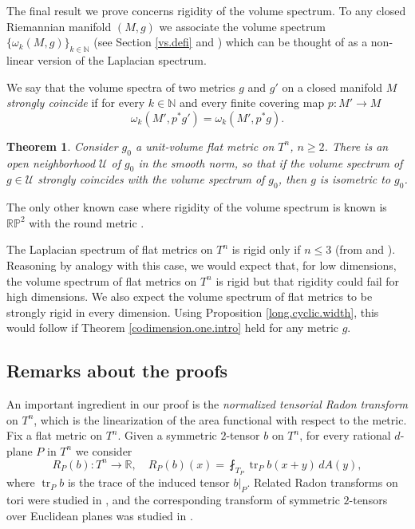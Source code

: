 \documentclass[11pt]{amsart}
\def\R{\mathbb R}
\def\RP{\mathbb {RP}}
\def\N{\mathbb N}
\def\tr{\operatorname{tr}}
\newtheorem{thm}{Theorem}[section]
\theoremstyle{remark}
\theoremstyle{definition}
\begin{document}
	The final result we prove concerns rigidity of the volume spectrum. To any closed Riemannian manifold $(M,g)$ we associate the volume spectrum $\{\omega_k(M,g)\}_{k\in\N}$ (see Section \ref{vs.defi} and \cite{lmn}) which can be thought of as a non-linear version of the Laplacian spectrum.
	
	We say that the volume spectra of two metrics $g$ and $g'$ on a closed manifold $M$ \emph{strongly coincide} if for every $k\in\mathbb N$ and every finite covering map $p:M'\to M$
	$$
	\omega_k(M',p^*g')=\omega_k(M',p^*g).
	$$
	\begin{thm}\label{spectrum.rigidity.intro} Consider  $g_0$ a unit-volume flat metric on $T^n$, $n\geq 2$. There is an open neighborhood $\mathcal U$ of $g_0$ in the smooth norm, so that if the volume spectrum of $g\in \mathcal U$  strongly coincides with the volume spectrum of $g_0$, then $g$ is isometric to $g_0$.
	\end{thm}
	The only other known case where rigidity of the volume spectrum is known is  $\RP^2$ with the round metric \cite[Theorem A]{AMN24}. 
	
	{The Laplacian spectrum of flat metrics on $T^n$ is rigid only if  $n\leq 3$ (from \cite[Theorem~A]{tanno-spectrum} and \cite{Schiemann90,Schiemann97}). Reasoning by analogy with this case, we would expect that, for low dimensions, the volume spectrum of flat metrics on $T^n$ is rigid but that rigidity could fail for high dimensions. We also expect the volume spectrum of flat metrics to be strongly rigid in every dimension.  Using Proposition \ref{long.cyclic.width}, this would follow if Theorem \ref{codimension.one.intro} held for any metric $g$.	
		
		\subsection{Remarks about the proofs}\label{remark.section}}
	
	An important ingredient in our proof is the \emph{normalized tensorial Radon transform} on $T^n$, which is the linearization of the area functional with respect to the metric. Fix a flat metric on $T^n$.  Given a symmetric $2$-tensor $b$ on $T^n$, for every  rational $d$-plane $P$ in $T^n$  we consider
	\begin{equation}\label{radon.definition}
		R_P(b):T^n\rightarrow \R, \quad R_P(b)(x)=\fint_{T_P}\tr _P b(x+y)\,dA(y),
	\end{equation}
	where $\tr_P b$ is the trace of the induced tensor $b|_P$. Related Radon transforms on tori were studied in \cite{Abouelaz11,AbouelazRouviere11,ilmavirta}, and the corresponding transform of symmetric $2$-tensors over Euclidean planes was studied in \cite{GrebnevStefanovUhlmannZhou26}.
	
\end{document}
